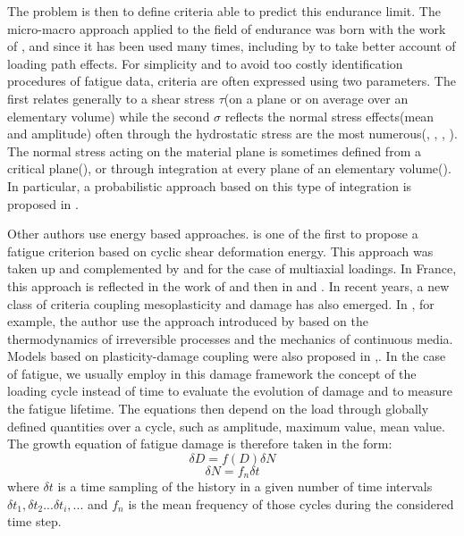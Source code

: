 \documentclass[3p,times,number,review]{elsarticle}
\begin{document}
The problem is then to define criteria able to predict this endurance limit. The micro-macro approach applied to the field of endurance was born with the work of \cite{van1973khmu}, and since it has been used many times, including by \cite{papadopoulos2001long} to take better account of loading path effects. For simplicity and to avoid too costly identification procedures of fatigue data, criteria are often expressed using two parameters. The first relates generally to a shear stress $\tau$(on a plane or on average over an elementary volume) while the second $\sigma$ reflects the normal stress effects(mean and amplitude) often through the hydrostatic stress are the most numerous(\cite{crossland1956effect}, \cite{sines1959behavior}, \cite{FFE:FFE452}, \cite{thu2008effet}).  The normal stress acting on the material plane is sometimes defined from a critical plane(\cite{findley1959}), or through integration at every plane of an elementary volume(\cite{liu1993berechnung}).  In particular, a probabilistic approach based on this type of integration is proposed in \cite{thu2008effet} .

Other authors use energy based approaches. \cite{ellyin1974criterion} is one of the first to propose a fatigue criterion based on cyclic shear deformation energy. This approach was taken up and complemented by \cite{lefebvre1981cognitive} and \cite{ellyin1991phase} for the case of multiaxial loadings. In France, this approach is reflected in the work of \cite{Froustey1992} and then in \cite{palin1996fatigue} and \cite{banvillet2001prevision}. In recent years, a new class of criteria coupling mesoplasticity and damage has also emerged. In \cite{lemaitre1999two}, for example, the author use the approach introduced by \cite{lemaitre1985mecanique} based on the thermodynamics of irreversible processes and the mechanics of continuous media.   Models based on plasticity-damage coupling were also proposed in \cite{flaceliere2004contribution},\cite{monchiet2006contributions}. In the case of fatigue, we usually employ in this damage framework the concept of the loading cycle instead of time to evaluate the evolution of damage and to measure the fatigue lifetime. The equations then depend on the load through globally defined quantities over a cycle, such as amplitude, maximum value, mean value. The growth equation of fatigue damage is therefore taken in the form:
$$\delta D=f(D)\delta N$$
$$\delta N=f_n\delta t$$
where $\delta t$ is a time sampling of the history in a given number of time intervals $\delta t_1,\delta t_2 ... \delta t_i, ...$ and $f_n$ is the mean frequency of those cycles during the considered time step.
\end{document}
